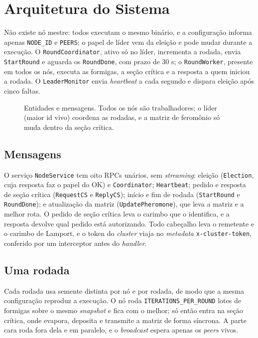 \section{Arquitetura do Sistema}

Não existe nó mestre: todos executam o mesmo binário, e a configuração informa apenas
\texttt{NODE\_ID} e \texttt{PEERS}; o papel de líder vem da eleição e pode mudar durante a
execução. O \texttt{RoundCoordinator}, ativo só no líder, incrementa a rodada, envia
\texttt{StartRound} e aguarda os \texttt{RoundDone}, com prazo de 30 s; o \texttt{RoundWorker},
presente em todos os nós, executa as formigas, a seção crítica e a resposta a quem iniciou a
rodada. O \texttt{LeaderMonitor} envia \textit{heartbeat} a cada segundo e dispara eleição após
cinco faltas.

\begin{figure}[ht]
  \centering
  \scalebox{0.78}{}
  \caption{Entidades e mensagens. Todos os n\'os s\~ao trabalhadores; o l\'ider (maior id vivo)
  coordena as rodadas, e a matriz de ferom\^onio s\'o muda dentro da se\c{c}\~ao cr\'itica.}
  \label{fig:arquitetura}
\end{figure}

\subsection{Mensagens}

O serviço \texttt{NodeService} tem oito RPCs unários, sem \textit{streaming}: eleição
(\texttt{Election}, cuja resposta faz o papel do OK) e \texttt{Coordinator}; \texttt{Heartbeat};
pedido e resposta de seção crítica (\texttt{RequestCS} e \texttt{ReplyCS}); início e fim de rodada
(\texttt{StartRound} e \texttt{RoundDone}); e atualização da matriz (\texttt{UpdatePheromone}), que
leva a matriz e a melhor rota. O pedido de seção crítica leva o carimbo que o identifica, e a
resposta devolve qual pedido está autorizando. Todo cabeçalho leva o remetente e o carimbo de
Lamport, e o token do \textit{cluster} viaja no \textit{metadata} \texttt{x-cluster-token},
conferido por um interceptor antes do \textit{handler}.

\subsection{Uma rodada}

Cada rodada usa semente distinta por nó e por rodada, de modo que a mesma configuração reproduz a
execução. O nó roda \texttt{ITERATIONS\_PER\_ROUND} lotes de formigas sobre o mesmo
\textit{snapshot} e fica com o melhor; só então entra na seção crítica, onde evapora, deposita e
transmite a matriz de forma síncrona. A parte cara roda fora dela e em paralelo, e o
\textit{broadcast} espera apenas os \textit{peers} vivos.
